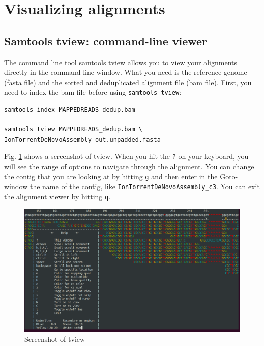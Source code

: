 \documentclass[11pt]{article}
\begin{document}
\section{Visualizing alignments}
\label{sec:orgheadline10}
\subsection{Samtools tview: command-line viewer}
\label{sec:orgheadline8}
The command line tool samtools tview allows you to view your
alignments directly in the command line window. What you need is the
reference genome (fasta file) and the sorted and deduplicated
alignment file (bam file). First, you need to index the bam file
before using \texttt{samtools tview}:


\begin{verbatim}
samtools index MAPPEDREADS_dedup.bam

samtools tview MAPPEDREADS_dedup.bam \
IonTorrentDeNovoAssembly_out.unpadded.fasta
\end{verbatim}


Fig. \ref{fig:orgparagraph1} shows a screenshot of tview.  When you hit the \texttt{?} on
your keyboard, you will see the range of options to navigate through
the alignment. You can change the contig that you are looking at by
hitting \texttt{g} and then enter in the Goto-window the name of the contig,
like \texttt{IonTorrentDeNovoAssembly\_c3}.  You can exit the alignment viewer
by hitting \texttt{q}.

\begin{figure}[htb]
\centering
\includegraphics[width=14.5cm]{tview.png}
\caption{\label{fig:orgparagraph1}
Screenshot of tview}
\end{figure}

\clearpage
\end{document}
